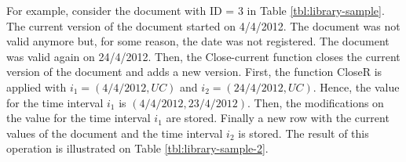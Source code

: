 For example, consider the document with ID = 3 in Table \ref{tbl:library-sample}. The current version of the document started on 4/4/2012. The document was not valid anymore but, for some reason, the date  was not registered. The document was valid again on 24/4/2012. Then, the Close-current function closes the current version of the document and adds a new version. First, the function CloseR is applied with $i_1 = \left(4/4/2012, UC \right)$ and $i_2 = \left(24/4/2012, UC \right)$. Hence, the value for the time interval $i_1$ is $ \left(4/4/2012, 23/4/2012 \right)$. Then, the modifications on the value for the time interval $i_1$ are stored. Finally a new row with the current values of the document and the time interval $i_2$ is stored.
The result of this operation is illustrated on Table \ref{tbl:library-sample-2}.




%
